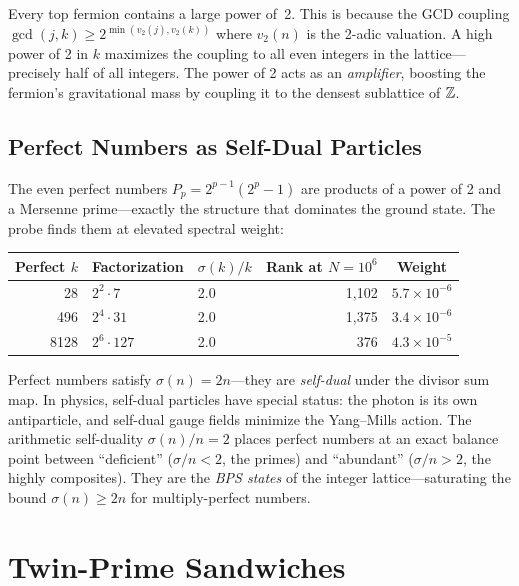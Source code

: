 \documentclass[11pt,a4paper]{article}
\begin{document}
Every top fermion contains a large power of~2. This is because the
GCD coupling $\gcd(j,k) \geq 2^{\min(v_2(j), v_2(k))}$ where
$v_2(n)$ is the 2-adic valuation. A high power of 2 in $k$
maximizes the coupling to all even integers in the lattice---precisely
half of all integers. The power of 2 acts as an \emph{amplifier},
boosting the fermion's gravitational mass by coupling it to the
densest sublattice of $\mathbb{Z}$.

\subsection{Perfect Numbers as Self-Dual Particles}
\label{sec:perfect}

The even perfect numbers $P_p = 2^{p-1}(2^p - 1)$ are products of a
power of 2 and a Mersenne prime---exactly the structure that dominates
the ground state. The probe finds them at elevated spectral weight:
\begin{center}
\begin{tabular}{@{}rllrc@{}}
\toprule
Perfect $k$ & Factorization & $\sigma(k)/k$ & Rank at $N = 10^6$ & Weight \\
\midrule
28    & $2^2 \cdot 7$   & 2.0 & 1{,}102  & $5.7 \times 10^{-6}$ \\
496   & $2^4 \cdot 31$  & 2.0 & 1{,}375  & $3.4 \times 10^{-6}$ \\
8128  & $2^6 \cdot 127$ & 2.0 & 376      & $4.3 \times 10^{-5}$ \\
\bottomrule
\end{tabular}
\end{center}

\begin{remark}
Perfect numbers satisfy $\sigma(n) = 2n$---they are \emph{self-dual}
under the divisor sum map. In physics, self-dual particles have special
status: the photon is its own antiparticle, and self-dual gauge fields
minimize the Yang--Mills action. The arithmetic self-duality
$\sigma(n)/n = 2$ places perfect numbers at an exact balance point
between ``deficient'' ($\sigma/n < 2$, the primes) and ``abundant''
($\sigma/n > 2$, the highly composites). They are the \emph{BPS states}
of the integer lattice---saturating the bound $\sigma(n) \geq 2n$
for multiply-perfect numbers.
\end{remark}

\section{Twin-Prime Sandwiches}
\label{sec:sandwiches}
\end{document}
